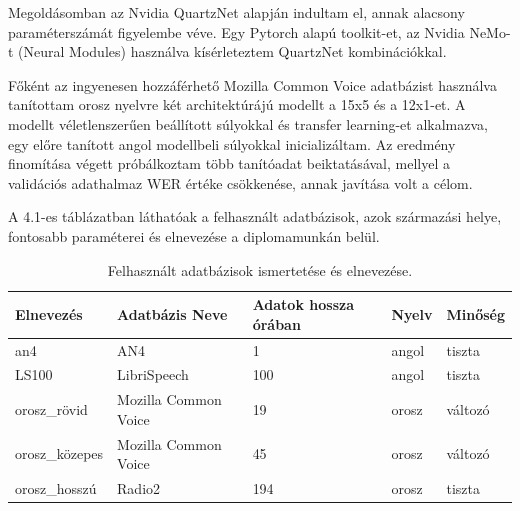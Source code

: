 Megoldásomban az Nvidia QuartzNet alapján indultam el, annak alacsony paraméterszámát figyelembe véve. Egy Pytorch alapú toolkit-et, az Nvidia NeMo-t (Neural Modules) használva kísérleteztem QuartzNet kombinációkkal.

Főként az ingyenesen hozzáférhető Mozilla Common Voice adatbázist használva tanítottam orosz nyelvre két architektúrájú modellt a 15x5 és a 12x1-et. A modellt véletlenszerűen beállított súlyokkal és transfer learning-et alkalmazva, egy előre tanított angol modellbeli súlyokkal inicializáltam. Az eredmény finomítása végett próbálkoztam több tanítóadat beiktatásával, mellyel a validációs adathalmaz WER értéke csökkenése, annak javítása volt a célom.

A 4.1-es táblázatban láthatóak a felhasznált adatbázisok, azok származási helye, fontosabb paraméterei és elnevezése a diplomamunkán belül.

\begin{table}[ht]
	\footnotesize
	\centering
	\begin{tabular}{ p{2cm} p{2cm} p{3cm} p{2cm} p{2.5cm} }
		\toprule
		\textbf{Elnevezés} & \textbf{Adatbázis Neve} & \textbf{Adatok hossza órában} & \textbf{Nyelv} & \textbf{Minőség} \\
		\midrule
		an4 & AN4 & 1 & angol & tiszta \\
		\hline
		LS100 & LibriSpeech & 100 & angol & tiszta \\
		\hline
		orosz\_rövid & Mozilla Common Voice & 19 & orosz & változó \\
		\hline
		orosz\_közepes &  Mozilla Common Voice & 45 & orosz & változó \\
		\hline
		orosz\_hosszú & Radio2 & 194 & orosz & tiszta \\
		\bottomrule
	\end{tabular}
	\caption{Felhasznált adatbázisok ismertetése és elnevezése.}
\end{table}